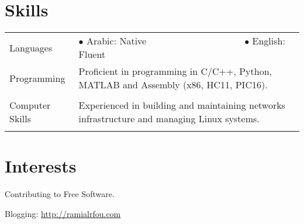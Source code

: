 \documentclass[a4paper, oneside, final]{scrartcl}
\newcommand{\twidthb}{12.65cm}
\newcommand{\twidtha}{3.0cm}
\begin{document}
\section{Skills}

\begin{tabular}{p{\twidtha} p{\twidthb}}
Languages & 

$\bullet$ Arabic: Native \,\,\,\,\,\,\,\,\,\,\,\,\,\,\,\,\,\,\,\,\,\,\,\,\,\,\,\,\,\,\,\,\,\,\,\,\,\,\,\,\,\,\,\,\,\,\,\,\,\,\,\,\,\,\,\,\,\,\,
$\bullet$ English: Fluent

\\
Programming & Proficient in programming in C/C++, Python, MATLAB and Assembly (x86, HC11, PIC16).
\\
\\
Computer Skills & Experienced in building and maintaining networks infrastructure and managing Linux systems.
\\ &
\end{tabular}

\section{Interests}
\vspace{-14pt}
\begin{multicols}{2}
        \begin{compactitem}
\item Contributing to Free Software.
\item Blogging: \url{http://ramialrfou.com}
            \end{compactitem} 
\end{multicols}


      
\end{document}
